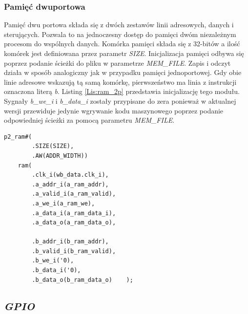 \documentclass[11pt,a4paper]{article}
\begin{document}
		\subsubsection{Pamięć dwuportowa}
			\hspace{5mm}
			Pamięć dwu portowa składa się z dwóch zestawów linii adresowych, danych i sterujących. Pozwala to na jednoczesny dostęp do pamięci dwóm niezależnym procesom do wspólnych danych. Komórka pamięci składa się z 32-bitów a ilość komórek jest definiowana przez parametr \textit{SIZE}. Inicjalizacja pamięci odbywa się poprzez podanie ścieżki do pliku w parametrze \textit{MEM\_FILE}. Zapis i odczyt działa w sposób analogiczny jak w przypadku pamięci jednoportowej. Gdy obie linie adresowe wskazują tą samą komórkę, pierwszeństwo ma linia z instrukcji oznaczona literą \textit{b}. Listing \ref{Lis:ram_2p} przedstawia inicjalizację tego modułu. Sygnały \textit{b\_we\_i} i \textit{b\_data\_i} zostały przypisane do zera ponieważ w aktualnej wersji przewiduje jedynie wgrywanie kodu maszynowego poprzez podanie odpowiedniej ścieżki za pomocą parametru \textit{MEM\_FILE}.\\
						\begin{minipage}{\textwidth}
\begin{scriptsize}
\begin{lstlisting}[label=Lis:ram_2p,caption=Inicjalizacja dwuportowej pamięci RAM]
    p2_ram#(
        .SIZE(SIZE),
        .AW(ADDR_WIDTH))
    ram(
        .clk_i(wb_data.clk_i),
        .a_addr_i(a_ram_addr),
        .a_valid_i(a_ram_valid),
        .a_we_i(a_ram_we),
        .a_data_i(a_ram_data_i),
        .a_data_o(a_ram_data_o),
		
        .b_addr_i(b_ram_addr),
        .b_valid_i(b_ram_valid),
        .b_we_i('0),
        .b_data_i('0),
        .b_data_o(b_ram_data_o)    );
\end{lstlisting}
\end{scriptsize}
\end{minipage}

	\subsection{\textit{GPIO}}
\end{document}
